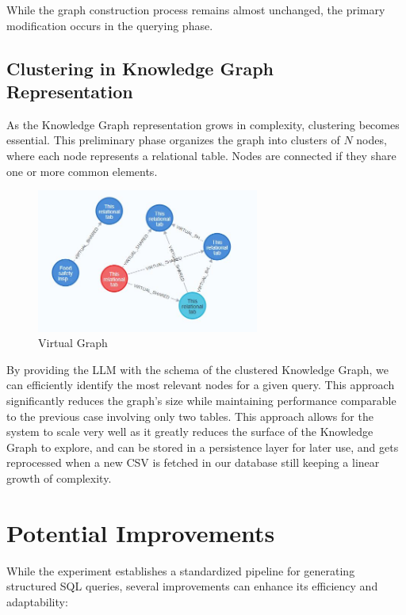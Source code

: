 While the graph construction process remains almost unchanged, the primary modification occurs in the querying phase.
\subsection{Clustering in Knowledge Graph Representation}
As the Knowledge Graph representation grows in complexity, clustering becomes essential. This preliminary phase organizes the graph into clusters of \( N \) nodes, where each node represents a relational table. Nodes are connected if they share one or more common elements. 
\begin{figure}[h]
    \centering
\includegraphics[width=0.65\textwidth]{IMAGES/Virtual Graph.JPG}
    \caption{Virtual Graph}
    \label{fig:Virtual Graph}
\end{figure}
By providing the LLM with the schema of the clustered Knowledge Graph, we can efficiently identify the most relevant nodes for a given query. This approach significantly reduces the graph’s size while maintaining performance comparable to the previous case involving only two tables. This approach allows for the system to scale very well as it greatly reduces the surface of the Knowledge Graph to explore, and can be stored in a persistence layer for later use, and gets reprocessed when a new CSV is fetched in our database still keeping a linear growth of complexity.

\section{Potential Improvements}

While the experiment establishes a standardized pipeline for generating structured SQL queries, several improvements can enhance its efficiency and adaptability:  

